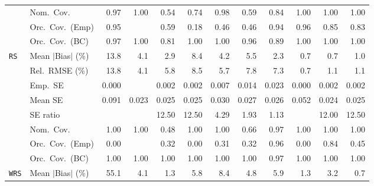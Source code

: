 \begin{landscape}
\begin{longtable}{llrrrrrrrrrr}
 & Nom.\ Cov. & \cellcolor{rankone}0.97 & \cellcolor{rankthree}1.00 & 0.54 & 0.74 & \cellcolor{ranktwo}0.98 & 0.59 & 0.84 & \cellcolor{rankthree}1.00 & \cellcolor{rankthree}1.00 & \cellcolor{rankthree}1.00 \\
 & Orc.\ Cov.\ (Emp) & \cellcolor{rankone}0.95 &  & 0.59 & 0.18 & 0.46 & 0.46 & \cellcolor{ranktwo}0.94 & \cellcolor{ranktwo}0.96 & \cellcolor{rankthree}0.85 & 0.83 \\
 & Orc.\ Cov.\ (BC) & \cellcolor{ranktwo}0.97 & \cellcolor{rankthree}1.00 & 0.81 & \cellcolor{rankthree}1.00 & \cellcolor{rankthree}1.00 & \cellcolor{rankone}0.96 & 0.89 & \cellcolor{rankthree}1.00 & \cellcolor{rankthree}1.00 & \cellcolor{rankthree}1.00 \\
\addlinespace[2pt]
\quad \texttt{RS} & Mean $|$Bias$|$ (\%) & 13.8 & 4.1 & 2.9 & 8.4 & 4.2 & 5.5 & \cellcolor{rankthree}2.3 & \cellcolor{rankone}0.7 & \cellcolor{rankone}0.7 & \cellcolor{ranktwo}1.0 \\
 & Rel.\ RMSE (\%) & 13.8 & \cellcolor{rankthree}4.1 & 5.8 & 8.5 & 5.7 & 7.8 & 7.3 & \cellcolor{rankone}0.7 & \cellcolor{ranktwo}1.1 & \cellcolor{ranktwo}1.1 \\
 & Emp.\ SE & 0.000 &  & 0.002 & 0.002 & 0.007 & 0.014 & 0.023 & 0.000 & 0.002 & 0.002 \\
 & Mean SE & 0.091 & 0.023 & 0.025 & 0.025 & 0.030 & 0.027 & 0.026 & 0.052 & 0.024 & 0.025 \\
 & SE ratio &  &  & 12.50 & 12.50 & \cellcolor{rankthree}4.29 & \cellcolor{ranktwo}1.93 & \cellcolor{rankone}1.13 &  & 12.00 & 12.50 \\
 & Nom.\ Cov. & \cellcolor{ranktwo}1.00 & \cellcolor{ranktwo}1.00 & 0.48 & \cellcolor{ranktwo}1.00 & \cellcolor{ranktwo}1.00 & \cellcolor{rankthree}0.66 & \cellcolor{rankone}0.97 & \cellcolor{ranktwo}1.00 & \cellcolor{ranktwo}1.00 & \cellcolor{ranktwo}1.00 \\
 & Orc.\ Cov.\ (Emp) & 0.00 &  & 0.32 & 0.00 & 0.31 & 0.32 & \cellcolor{rankone}0.96 & 0.00 & \cellcolor{ranktwo}0.84 & \cellcolor{rankthree}0.45 \\
 & Orc.\ Cov.\ (BC) & \cellcolor{ranktwo}1.00 & \cellcolor{ranktwo}1.00 & \cellcolor{ranktwo}1.00 & \cellcolor{ranktwo}1.00 & \cellcolor{ranktwo}1.00 & \cellcolor{ranktwo}1.00 & \cellcolor{rankone}0.97 & \cellcolor{ranktwo}1.00 & \cellcolor{ranktwo}1.00 & \cellcolor{ranktwo}1.00 \\
\addlinespace[2pt]
\quad \texttt{WRS} & Mean $|$Bias$|$ (\%) & 55.1 & 4.1 & \cellcolor{ranktwo}1.3 & 5.8 & 8.4 & 4.8 & 5.9 & \cellcolor{ranktwo}1.3 & \cellcolor{rankthree}3.2 & \cellcolor{rankone}0.7 \\

\end{longtable}
\end{landscape}
